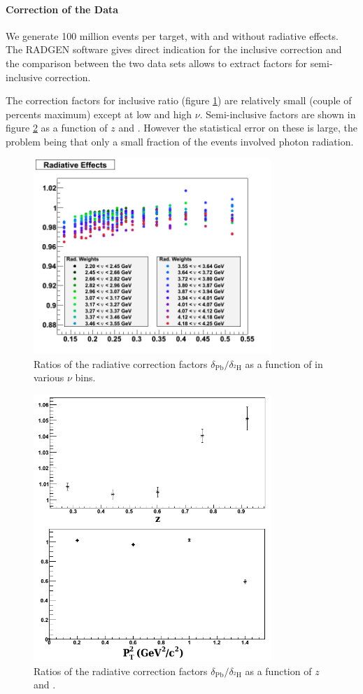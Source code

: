 \paragraph{Correction of the Data}

We generate 100 million events per target, with and without radiative effects.
The RADGEN software gives direct indication for the inclusive correction and 
the comparison between the two data sets allows to extract factors for 
semi-inclusive correction.

The correction factors for inclusive ratio (figure \ref{fig:RadCorrFac}) are 
relatively small (couple of percents maximum) except at low \xb and high $\nu$. Semi-inclusive factors are 
shown in figure \ref{fig:RadCorrFacSIDIS} as a function of $z$ and \ptp. However 
the statistical error on these is large, the problem being that only a small 
fraction of the events involved photon radiation.

\begin{figure}[htbp]
\centering
\includegraphics[width=9cm] {chap5-fig/ElecRadWei_Lead.png}
\caption {Ratios of the radiative correction factors $\delta_\text{Pb}/
\delta_{^2\text{H}}$ as a function of \xb in various $\nu$ bins.}
\label{fig:RadCorrFac}
\end{figure}

\begin{figure}[htbp]
\centering
\includegraphics[width=9cm] {chap5-fig/RadGenFactors.png}
\caption {Ratios of the radiative correction factors $\delta_\text{Pb}/
\delta_{^2\text{H}}$ as a function of $z$ and \ptp.}
\label{fig:RadCorrFacSIDIS}
\end{figure}

